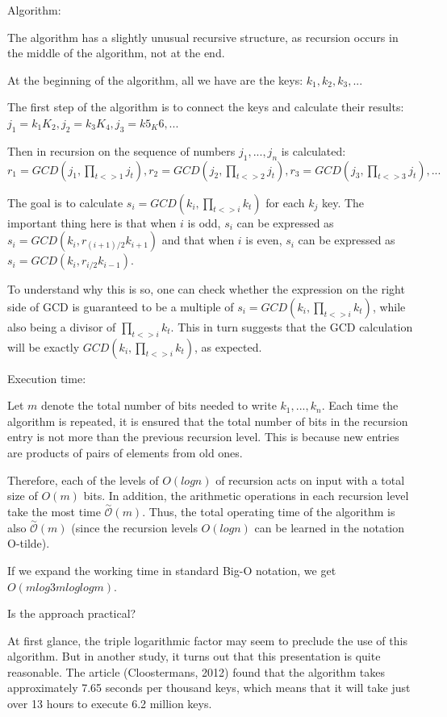 \documentclass[runningheads]{llncs}
\begin{document}
Algorithm:

The algorithm has a slightly unusual recursive structure, as recursion occurs in the middle of the algorithm, not at the end.

At the beginning of the algorithm, all we have are the keys: $k_1, k_2, k_3, ...$

The first step of the algorithm is to connect the keys and calculate their results: $j_1=k_1K_2, j_2=k_3K_4, j_3=k5_K6, ...$

Then in recursion on the sequence of numbers $j_1, ..., j_n$ is calculated: $r_1 = GCD(j_1,\prod_{t<>1}j_t), r_2 = GCD(j_2,\prod_{t<>2}j_t), r_3 = GCD(j_3,\prod_{t<>3}j_t), ...$

The goal is to calculate $s_i = GCD (k_i, \prod_{t<>i} k_t)$ for each $k_j$ key. The important thing here is that when $i$ is odd, $s_i$ can be expressed as $s_i = GCD (k_i, r_{(i + 1)/2} k_{i+1})$ and that when $i$ is even, $s_i$ can be expressed as $s_i = GCD (k_i, r_{i/2} k_{i-1})$. 

To understand why this is so, one can check whether the expression on the right side of GCD is guaranteed to be a multiple of $s_i = GCD (k_i, \prod_{t<>i} k_t)$, while also being a divisor of $\prod_{t<>i} k_t$. This in turn suggests that the GCD calculation will be exactly $GCD(k_i, \prod_{t<>i} k_t)$, as expected.

Execution time:

Let $m$ denote the total number of bits needed to write $k_1, ..., k_n$. Each time the algorithm is repeated, it is ensured that the total number of bits in the recursion entry is not more than the previous recursion level. This is because new entries are products of pairs of elements from old ones.

Therefore, each of the levels of $O (log n)$ of recursion acts on input with a total size of $O (m)$ bits. In addition, the arithmetic operations in each recursion level take the most time $\overset{\sim}{\mathcal{O}} (m)$. Thus, the total operating time of the algorithm is also $\overset{\sim}{\mathcal{O}} (m)$ (since the recursion levels $O (log n)$ can be learned in the notation O-tilde).

If we expand the working time in standard Big-O notation, we get $O (m log3 m log log m)$. 

Is the approach practical?

At first glance, the triple logarithmic factor may seem to preclude the use of this algorithm. But in another study, it turns out that this presentation is quite reasonable. The article (Cloostermans, 2012) found that the algorithm takes approximately 7.65 seconds per thousand keys, which means that it will take just over 13 hours to execute 6.2 million keys.
\end{document}
